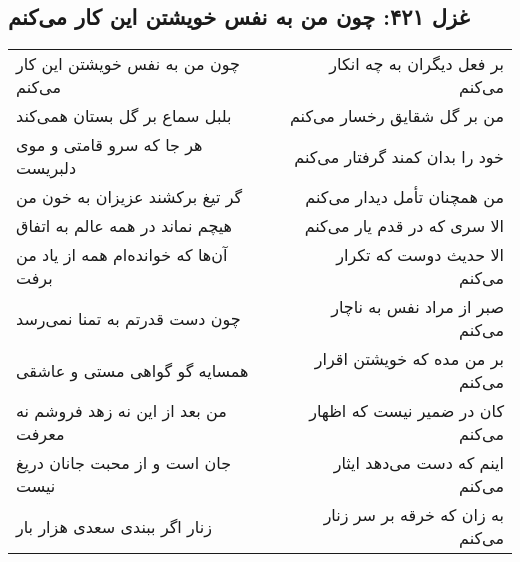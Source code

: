 \begin{center}
\section*{غزل ۴۲۱: چون من به نفس خویشتن این کار می‌کنم}
\label{sec:421}
\begin{longtable}{l p{0.5cm} r}
چون من به نفس خویشتن این کار می‌کنم
&&
بر فعل دیگران به چه انکار می‌کنم
\\
بلبل سماع بر گل بستان همی‌کند
&&
من بر گل شقایق رخسار می‌کنم
\\
هر جا که سرو قامتی و موی دلبریست
&&
خود را بدان کمند گرفتار می‌کنم
\\
گر تیغ برکشند عزیزان به خون من
&&
من همچنان تأمل دیدار می‌کنم
\\
هیچم نماند در همه عالم به اتفاق
&&
الا سری که در قدم یار می‌کنم
\\
آن‌ها که خوانده‌ام همه از یاد من برفت
&&
الا حدیث دوست که تکرار می‌کنم
\\
چون دست قدرتم به تمنا نمی‌رسد
&&
صبر از مراد نفس به ناچار می‌کنم
\\
همسایه گو گواهی مستی و عاشقی
&&
بر من مده که خویشتن اقرار می‌کنم
\\
من بعد از این نه زهد فروشم نه معرفت
&&
کان در ضمیر نیست که اظهار می‌کنم
\\
جان است و از محبت جانان دریغ نیست
&&
اینم که دست می‌دهد ایثار می‌کنم
\\
زنار اگر ببندی سعدی هزار بار
&&
به زان که خرقه بر سر زنار می‌کنم
\\
\end{longtable}
\end{center}
